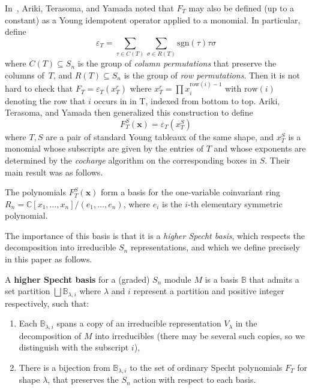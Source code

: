 \documentclass[ALCO,Unicode]{cedram}
\newcommand{\sgn}{\mathrm{sgn}}
\begin{document}
In~\cite{ATY}, Ariki, Terasoma, and Yamada noted that $F_T$ may also be defined (up to a constant) as a Young idempotent operator applied to a monomial.  In particular, define $$\varepsilon_T=\sum_{\tau \in C(T)}\sum_{\sigma \in R(T)}\sgn(\tau) \tau \sigma$$ where $C(T)\subseteq S_n$ is the group of \textit{column permutations} that preserve the columns of~$T$, and $R(T)\subseteq S_n$ is the group of \textit{row permutations}. 
Then it is not hard to check that $F_T=\varepsilon_T(x_T^r)$ where $x_T^r=\prod x_i^{\mathrm{row}(i)-1}$ with $\mathrm{row}(i)$ denoting the row that $i$ occurs in in T, indexed from bottom to top.  Ariki, Terasoma, and Yamada then generalized this construction to define 
\begin{equation}\label{eq:ATY} F_T^S(\mathbf{x}) = \varepsilon_T(x_T^S)\end{equation} 
where $T,S$ are a pair of standard Young tableaux of the same shape, and $x_T^S$ is a monomial whose subscripts are given by the entries of $T$ and whose exponents are determined by the \textit{cocharge} algorithm on the corresponding boxes in $S$.  Their main result was as follows.

\begin{thm}
	The polynomials $F_T^S(\mathbf{x})$ form a basis for the one-variable coinvariant ring $R_n=\mathbb{C}[x_1,\ldots,x_n]/(e_1,\ldots,e_n)$, where $e_i$ is the $i$-th elementary symmetric polynomial.
\end{thm}

The importance of this basis is that it is a \textit{higher Specht basis}, which respects the decomposition into irreducible $S_n$ representations, and which we define precisely in this paper as follows.

\begin{definition}
	A \textbf{higher Specht basis} for a (graded) $S_n$ module $M$ is a basis $\mathbb{B}$ that admits a set partition $\bigsqcup \mathbb{B}_{\lambda,i}$ where $\lambda$ and $i$ represent a partition and positive integer respectively, such that:
	\begin{enumerate}
		\item Each $\mathbb{B}_{\lambda,i}$ spans a copy of an irreducible representation $V_\lambda$ in the decomposition of $M$ into irreducibles (there may be several such copies, so we distinguish with the subscript $i$),
		\item There is a bijection from $\mathbb{B}_{\lambda,i}$ to the set of ordinary Specht polynomials $F_T$ for shape $\lambda$, that preserves the $S_n$ action with respect to each basis.
	\end{enumerate} 
\end{definition}
\end{document}
